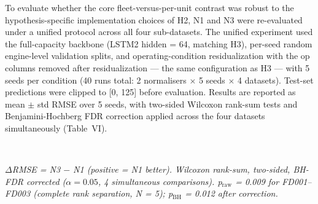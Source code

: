 \documentclass[preprint,10pt]{elsarticle}
\begin{document}
To evaluate whether the core fleet-versus-per-unit contrast was robust to the hypothesis-specific implementation choices of H2, N1 and N3 were re-evaluated under a unified protocol across all four sub-datasets. The unified experiment used the full-capacity backbone (LSTM2 hidden = 64, matching H3), per-seed random engine-level validation splits, and operating-condition residualization with the op columns removed after residualization --- the same configuration as H3 --- with 5 seeds per condition (40 runs total: 2 normalisers $\times$ 5 seeds $\times$ 4 datasets). Test-set predictions were clipped to [0, 125] before evaluation. Results are reported as mean $\pm$ std RMSE over 5 seeds, with two-sided Wilcoxon rank-sum tests and Benjamini-Hochberg FDR correction applied across the four datasets simultaneously (Table~VI).

\begin{table}[!t]
\centering
\footnotesize
\caption{Protocol-unified N1 vs N3 robustness analysis: RMSE (mean$\pm$std, 5 seeds), effect size, and BH-FDR-corrected significance using a backbone-matched unified protocol (LSTM2 hidden = 64, per-seed validation split, op columns removed after residualization).}
\label{tab:va}
\\[3pt]
\begin{minipage}{\linewidth}
\footnotesize\textit{$\Delta$RMSE = N3 $-$ N1 (positive = N1 better). Wilcoxon rank-sum, two-sided, BH-FDR corrected ($\alpha = 0.05$, 4 simultaneous comparisons). p$_\text{raw}$ = 0.009 for FD001--FD003 (complete rank separation, N = 5); p$_\text{BH}$ = 0.012 after correction.}
\end{minipage}
\end{table}
\end{document}
